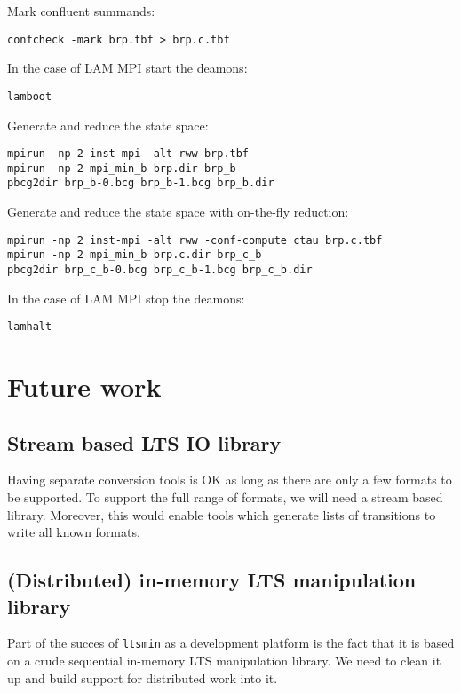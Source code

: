 \documentclass{cwiarticle}
\begin{document}
Mark confluent summands:
\begin{verbatim}
confcheck -mark brp.tbf > brp.c.tbf
\end{verbatim}

In the case of LAM MPI start the deamons:
\begin{verbatim}
lamboot
\end{verbatim}

Generate and reduce the state space:
\begin{verbatim}
mpirun -np 2 inst-mpi -alt rww brp.tbf
mpirun -np 2 mpi_min_b brp.dir brp_b
pbcg2dir brp_b-0.bcg brp_b-1.bcg brp_b.dir
\end{verbatim}

Generate and reduce the state space with on-the-fly reduction:
\begin{verbatim}
mpirun -np 2 inst-mpi -alt rww -conf-compute ctau brp.c.tbf
mpirun -np 2 mpi_min_b brp.c.dir brp_c_b
pbcg2dir brp_c_b-0.bcg brp_c_b-1.bcg brp_c_b.dir
\end{verbatim}

In the case of LAM MPI stop the deamons:
\begin{verbatim}
lamhalt
\end{verbatim}

\section{Future work}

\subsection*{Stream based LTS IO library}

Having separate conversion tools is OK as long as there are only a few formats
to be supported. To support the full range of formats, we will need a stream based
library. Moreover, this would enable tools which generate lists of transitions to write
all known formats.

\subsection*{(Distributed) in-memory LTS manipulation library}

Part of the succes of \verb+ltsmin+ as a development platform is the
fact that it is based on a crude sequential in-memory LTS manipulation library.
We need to clean it up and build support for distributed work into it.
\end{document}

